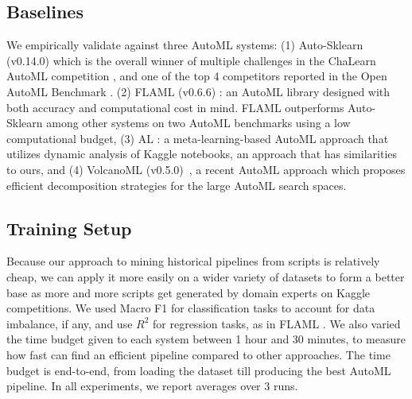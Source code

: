





\subsection{Baselines}
We empirically validate {\sysname} against three AutoML systems: (1) Auto-Sklearn (v0.14.0) \cite{autosklearn} which is the overall winner of multiple challenges in the ChaLearn AutoML competition \cite{chalearn}, and one of the top 4 competitors reported in the Open AutoML Benchmark \cite{automl_benchmark}. (2) FLAML (v0.6.6) \cite{flaml}: an AutoML library designed with both accuracy and computational cost in mind. FLAML outperforms Auto-Sklearn among other systems on two AutoML benchmarks using a low computational budget, (3) AL \cite{al}: a meta-learning-based AutoML approach that utilizes dynamic analysis of Kaggle notebooks, an approach that has similarities to ours, and (4) VolcanoML (v0.5.0)~\cite{VolcanoML}, a recent AutoML approach which proposes efficient decomposition strategies for the large AutoML search spaces. 

\subsection{Training Setup} 
Because our approach to mining historical pipelines from scripts is relatively cheap, we can apply it more easily on a wider variety of datasets to form a better base as more and more scripts get generated by domain experts on Kaggle competitions.   
We used Macro F1 for classification tasks to account for data imbalance, if any, and use $R^2$ for regression tasks, as in FLAML \cite{flaml}. We  also varied the time budget given to each system between 1 hour and 30 minutes, to measure how fast can {\sysname} find an efficient pipeline compared to other approaches. The time budget is end-to-end, from loading the dataset till producing the best AutoML pipeline. In all experiments, we report averages over 3 runs.


